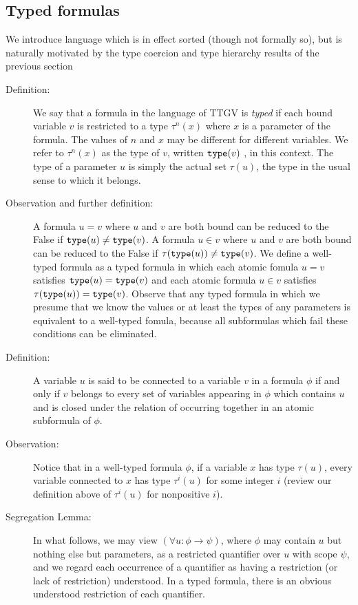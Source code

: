 \documentclass[12pt]{article}
\begin{document}
\subsection{Typed formulas}

We introduce language which is in effect sorted (though not formally so), but is naturally motivated by the type coercion and type hierarchy results of the previous section

\begin{description}

\item[Definition:]  We say that a formula in the language of TTGV is {\em typed\/} if each bound variable $v$ is restricted to a type $\tau^n(x)$ where $x$ is a parameter of the formula.  The values of $n$ and $x$ may be different for different variables.  We refer to $\tau^n(x)$ as the type of $v$, written ${\tt type}(v)$ , in this context.  The type of a parameter $u$ is simply the actual set $\tau(u)$, the type in the usual sense to which it belongs.

\item[Observation and further definition:]  A formula $u=v$ where $u$ and $v$ are both bound can be reduced to the False if ${\tt type}(u) \neq {\tt type}(v)$.  A formula $u \in v$ where $u$ and $v$ are both bound can be reduced to the False if $\tau({\tt type}(u)) \neq {\tt type}(v)$.   We define a well-typed formula as a typed formula in which
each atomic fomula $u=v$ satisfies ${\tt type}(u) = {\tt type}(v)$ and each atomic formula $u \in v$ satisfies $\tau({\tt type}(u)) = {\tt type}(v)$.  Observe that any typed formula in which we presume that we know the values or at least the types of any parameters is equivalent to a well-typed fomula, because all subformulas which fail these conditions can be eliminated.

\item[Definition:]  A variable $u$ is said to be connected to a variable $v$ in a formula $\phi$ if and only if $v$ belongs to every set of variables appearing in $\phi$ which contains $u$ and is closed under the relation of occurring together in an atomic subformula of $\phi$. 

\item[Observation:]  Notice that in a well-typed formula $\phi$, if a variable $x$ has type $\tau(u)$, every variable connected to $x$ has type $\tau^i(u)$ for some integer $i$ (review our definition above of $\tau^i(u)$ for nonpositive $i$).

\item[Segregation Lemma:]  
In what follows, we may view $(\forall u:\phi \rightarrow \psi)$, where $\phi$ may contain $u$ but nothing else but parameters, as a restricted quantifier over $u$ with scope $\psi$, and we regard each occurrence of a quantifier as having a restriction (or lack of restriction) understood.  In a typed formula, there is an obvious understood restriction of each quantifier.


\end{description}
\end{document}

